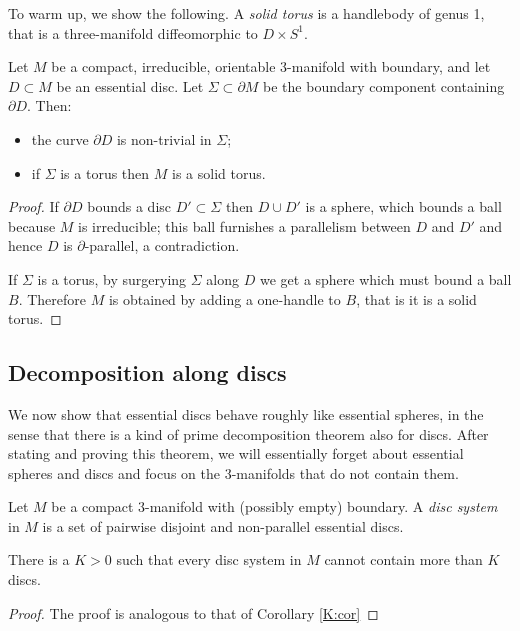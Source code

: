 To warm up, we show the following. A \emph{solid torus} is a handlebody of genus 1, that is a three-manifold diffeomorphic to $D\times S^1$.

\begin{prop} \label{irreducible:solid:torus:prop}
Let $M$ be a compact, irreducible, orientable 3-manifold with boundary, and let $D\subset M$ be an essential disc. Let $\Sigma \subset \partial M$ be the boundary component containing $\partial D$. Then:
\begin{itemize}
\item the curve $\partial D$ is non-trivial in $\Sigma$;
\item if $\Sigma$ is a torus then $M$ is a solid torus.
\end{itemize}
\end{prop}
\begin{proof}
If $\partial D$ bounds a disc $D'\subset \Sigma$ then $D\cup D'$ is a sphere, which bounds a ball because $M$ is irreducible; this ball furnishes a parallelism between $D$ and $D'$ and hence $D$ is $\partial$-parallel, a contradiction. 

If $\Sigma$ is a torus, by surgerying $\Sigma$ along $D$ we get a sphere which must bound a ball $B$. Therefore $M$ is obtained by adding a one-handle to $B$, that is it is a solid torus.
\end{proof}

\subsection{Decomposition along discs}
We now show that essential discs behave roughly like essential spheres, in the sense that there is a kind of prime decomposition theorem also for discs. After stating and proving this theorem, we will essentially forget about essential spheres and discs and focus on the 3-manifolds that do not contain them.

Let $M$ be a compact 3-manifold with (possibly empty) boundary. A \emph{disc system} in $M$ is a set of pairwise disjoint and non-parallel essential discs. 
 
\begin{prop} \label{K2:prop}
There is a $K>0$ such that every disc system in $M$ cannot contain more than $K$ discs.
\end{prop}
\begin{proof}
The proof is analogous to that of Corollary \ref{K:cor}
\end{proof}

